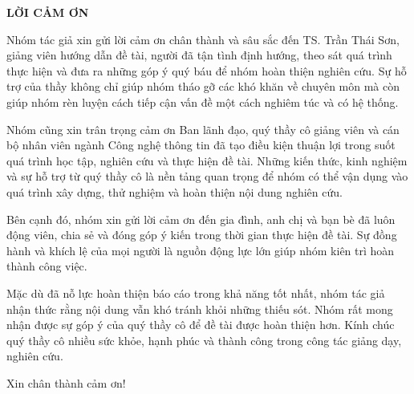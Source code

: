 {}

\begin{center}
{\large\bfseries{LỜI CẢM ƠN}}
\end{center}

\indent Nhóm tác giả xin gửi lời cảm ơn chân thành và sâu sắc đến TS. Trần Thái Sơn, giảng viên hướng dẫn đề tài, người đã tận tình định hướng, theo sát quá trình thực hiện và đưa ra những góp ý quý báu để nhóm hoàn thiện nghiên cứu. Sự hỗ trợ của thầy không chỉ giúp nhóm tháo gỡ các khó khăn về chuyên môn mà còn giúp nhóm rèn luyện cách tiếp cận vấn đề một cách nghiêm túc và có hệ thống.

\indent Nhóm cũng xin trân trọng cảm ơn Ban lãnh đạo, quý thầy cô giảng viên và cán bộ nhân viên ngành Công nghệ thông tin đã tạo điều kiện thuận lợi trong suốt quá trình học tập, nghiên cứu và thực hiện đề tài. Những kiến thức, kinh nghiệm và sự hỗ trợ từ quý thầy cô là nền tảng quan trọng để nhóm có thể vận dụng vào quá trình xây dựng, thử nghiệm và hoàn thiện nội dung nghiên cứu.

\indent Bên cạnh đó, nhóm xin gửi lời cảm ơn đến gia đình, anh chị và bạn bè đã luôn động viên, chia sẻ và đóng góp ý kiến trong thời gian thực hiện đề tài. Sự đồng hành và khích lệ của mọi người là nguồn động lực lớn giúp nhóm kiên trì hoàn thành công việc.

\indent Mặc dù đã nỗ lực hoàn thiện báo cáo trong khả năng tốt nhất, nhóm tác giả nhận thức rằng nội dung vẫn khó tránh khỏi những thiếu sót. Nhóm rất mong nhận được sự góp ý của quý thầy cô để đề tài được hoàn thiện hơn. Kính chúc quý thầy cô nhiều sức khỏe, hạnh phúc và thành công trong công tác giảng dạy, nghiên cứu.

\indent Xin chân thành cảm ơn!
